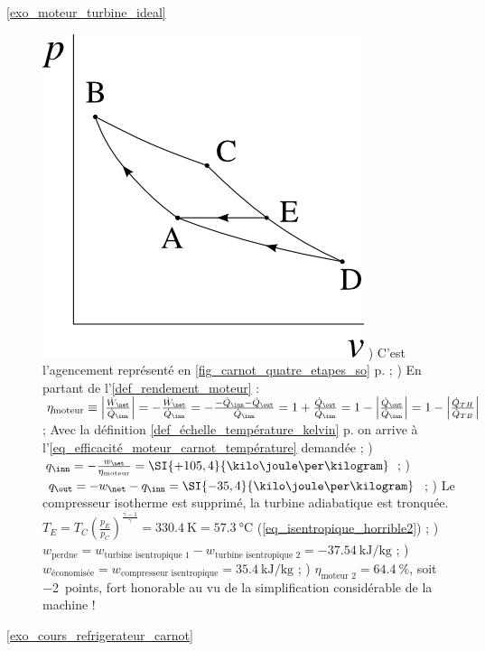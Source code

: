 \begin{description}
		\item [\ref{exo_moteur_turbine_ideal}]
					\includegraphics[width=\solutiondiagramwidth]{images/exo_sol_pv_carnot_turbine.png}
					) C’est l’agencement représenté en \cref{fig_carnot_quatre_etapes_so} p.\pageref{fig_carnot_quatre_etapes_so} ;
					) En partant de l’\cref{def_rendement_moteur}  : $\eta_\text{moteur}
						\equiv \left| \frac{\dot W_\net}{\dot Q_\inn} \right|
						= - \frac{\dot W_\net}{\dot Q_\inn}
						= - \frac{-\dot Q_\inn - \dot Q_\out}{\dot Q_\inn}
						= 1 + \frac{\dot Q_\out}{\dot Q_\inn}
						= 1 - \left|\frac{\dot Q_\out}{\dot Q_\inn}\right|
						= 1 - \left|\frac{\dot Q_{TH}}{\dot Q_{TB}}\right|$ ; Avec la définition \ref{def_échelle_température_kelvin} p.\pageref{def_échelle_température_kelvin} on arrive à l’\cref{eq_efficacité_moteur_carnot_température} demandée ;
					) ${q}_\inn = -\frac{w_\net}{\eta_\text{moteur}} = \SI{+105,4}{\kilo\joule\per\kilogram}$ ;
					) ${q}_\out = -w_\net - q_\inn = \SI{-35,4}{\kilo\joule\per\kilogram}$ ;
					) Le compresseur isotherme est supprimé, la turbine adiabatique est tronquée. $T_E = T_C \left(\frac{p_E}{p_C}\right)^\frac{\gamma - 1}{\gamma} = \SI{330,4}{\kelvin} = \SI{57,3}{\degreeCelsius}$ (\ref{eq_isentropique_horrible2}) ;
					) $w_\text{perdue} = w_\text{turbine isentropique 1} - w_\text{turbine isentropique 2} = \SI{-37,54}{\kilo\joule\per\kilogram}$ ;
					) $w_\text{économisée} = w_\text{compresseur isentropique} = \SI{+35,4}{\kilo\joule\per\kilogram}$ ;
					) $\eta_\text{moteur 2} = \SI{64,4}{\percent}$, soit \SI{-2}{points}, fort honorable au vu de la simplification considérable de la machine !
		\item [\ref{exo_cours_refrigerateur_carnot}]

\end{description}
